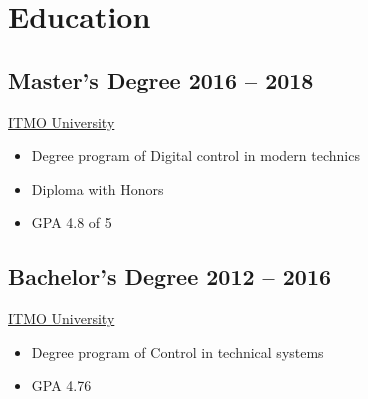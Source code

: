 \documentclass[10pt]{article}
\begin{document}
    \section*{Education}    
    \begin{minipage}[t]{0.5\linewidth}
        \subsection*{Master's Degree \hfill {\color{gray}2016 – 2018}}
        \href{https://en.itmo.ru/}{ITMO University}
        \begin{itemize}
            \item Degree program of Digital control in modern technics
            \item Diploma with Honors
            \item GPA 4.8 of 5
        \end{itemize}
    \end{minipage}
    \hfill%
    \begin{minipage}[t]{0.45\linewidth}
        \subsection*{Bachelor's Degree \hfill {\color{gray}2012 – 2016}}
        \href{https://en.itmo.ru/}{ITMO University}
        \begin{itemize}
            \item Degree program of Control in technical systems
            \item GPA 4.76 
        \end{itemize}
    \end{minipage}
\end{document}
